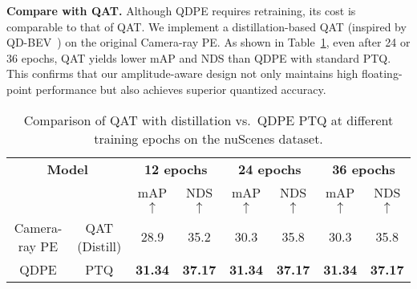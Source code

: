 \textbf{Compare with QAT.} Although QDPE requires retraining, its cost is comparable to that of QAT. We implement a distillation-based QAT (inspired by QD-BEV~\cite{zhang2023qd}) on the original Camera-ray PE. As shown in Table~\ref{tab:qat_compare}, even after 24 or 36 epochs, QAT yields lower mAP and NDS than QDPE with standard PTQ. This confirms that our amplitude-aware design not only maintains high floating-point performance but also achieves superior quantized accuracy.
\begin{table}[htb] %
    \vspace{-2mm}
    \setlength{\tabcolsep}{0.35mm}
    \centering
    \footnotesize
    \begin{tabular}{cc|cc|cc|cc}
    \toprule[1.5pt]
    \multicolumn{2}{c|}{\textbf{Model}} & \multicolumn{2}{c|}{\textbf{12 epochs}} & \multicolumn{2}{c|}{\textbf{24 epochs}} & \multicolumn{2}{c}{\textbf{36 epochs}} \\
    \cline{3-8}
    & & mAP$\uparrow$ & NDS$\uparrow$ & mAP$\uparrow$ & NDS$\uparrow$ & mAP$\uparrow$ & NDS$\uparrow$ \\
    \noalign{\smallskip}
    \hline
    \noalign{\smallskip}
    Camera-ray PE
    & QAT (Distill) & 28.9 & 35.2 & 30.3 & 35.8 & 30.3 & 35.8 \\
    QDPE & PTQ    & \textbf{31.34} & \textbf{37.17} & \textbf{31.34} & \textbf{37.17} & \textbf{31.34} & \textbf{37.17} \\
    \bottomrule[1.5pt]
    \end{tabular}
    \vspace{-0.2cm}
    \caption{Comparison of QAT with distillation vs.\ QDPE PTQ at different training epochs on the nuScenes dataset.}
    \label{tab:qat_compare}
    \vspace{-0.5cm}
\end{table}


